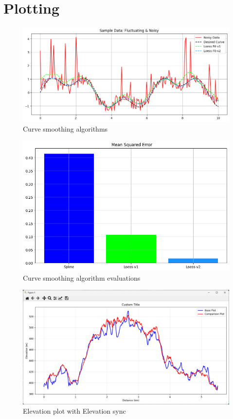 \documentclass[12pt]{article}
\begin{document}
\section{Plotting}
\begin{figure}[h!]
    \centering
    \includegraphics[width=\textwidth]{Project_Screenshots/curve_smooth.png}
    \caption{Curve smoothing algorithms}
\end{figure}
\begin{figure}[h!]
    \centering
    \includegraphics[width=\textwidth]{Project_Screenshots/curve smooth 2.png}
    \caption{Curve smoothing algorithm evaluations}
\end{figure}
\begin{figure}[h!]
    \centering
    \includegraphics[width=\textwidth]{Project_Screenshots/sync.png}
    \caption{Elevation plot with Elevation sync}
\end{figure}
\end{document}
